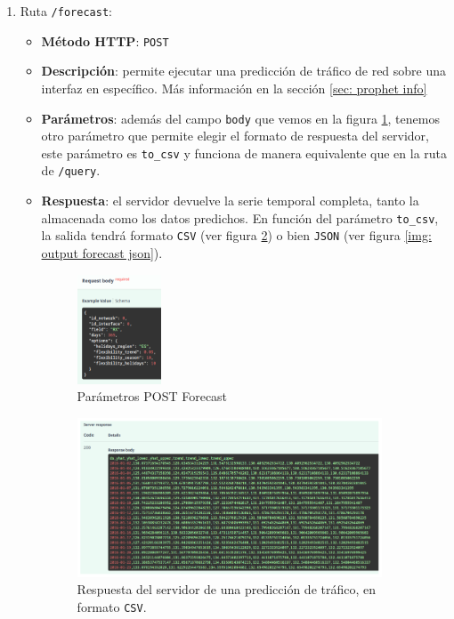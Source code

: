 \documentclass[a4paper, oneside, 12pt]{book}
\begin{document}
	\begin{enumerate}
		\item Ruta \texttt{/forecast}:
		
		\begin{itemize}
			\item \textbf{Método HTTP}: \texttt{POST}
			\item \textbf{Descripción}: permite ejecutar una predicción de tráfico de red sobre una interfaz en específico. Más información en la sección \ref{sec: prophet info}
			\item \textbf{Parámetros}: además del campo \texttt{body} que vemos en la figura \ref{img: parameters post forecast}, tenemos otro parámetro que permite elegir el formato de respuesta del servidor, este parámetro es \texttt{to\_csv} y funciona de manera equivalente que en la ruta de \texttt{/query}.
			\item \textbf{Respuesta}: el servidor devuelve la serie temporal completa, tanto la almacenada como los datos predichos. En función del parámetro \texttt{to\_csv}, la salida tendrá formato \texttt{CSV} (ver figura \ref{img: output forecast csv}) o bien \texttt{JSON} (ver figura \ref{img: output forecast json}).
			
			\begin{figure}[h!]
				\begin{center}
					\includegraphics[width=0.25\textwidth]{img/parameters_post_forecast.png}
					\caption{Parámetros POST Forecast}
					\label{img: parameters post forecast}
				\end{center}
			\end{figure}
		
			\begin{figure}[h!]
				\begin{center}
					\includegraphics[width=0.91\textwidth]{img/output_forecast_csv.png}
					\caption{Respuesta del servidor de una predicción de tráfico, en formato \texttt{CSV}.}
					\label{img: output forecast csv}
				\end{center}
			\end{figure}
		

\end{itemize}
\end{enumerate}
\end{document}
